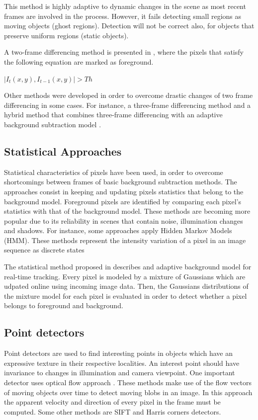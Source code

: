 This method is highly adaptive to dynamic changes in the scene as most recent frames are involved in the process. However, it fails detecting small regions as moving objects (ghost regions). Detection will not be correct also, for objects that preserve uniform regions (static objects).

A two-frame differencing method is presented in \cite{Lipton1998a}, where the pixels that satisfy the following equation are marked as foreground.\\
\centerline{$|I_t(x,y), I_{t-1}(x,y)|>Th$}

Other methods were developed in order to overcome drastic changes of two frame differencing in some cases. For instance, a three-frame differencing method \cite{Wang2003} and a hybrid method that combines three-frame differencing with an adaptive background subtraction model \cite{Collins2000}.

\subsection{Statistical Approaches}

Statistical characteristics of pixels have been used, in order to overcome shortcomings between frames of basic background subtraction methods. The approaches consist in keeping and updating pixels statistics that belong to the background model. Foreground pixels are identified by comparing each pixel's statistics with that of the background model. These methods are becoming more popular due to its reliability in scenes that contain noise, illumination changes and shadows. For instance, some approaches apply Hidden Markov Models (HMM). These methods \cite{Stenger2001,Rittscher2000} represent the intensity variation of a pixel in an image sequence as discrete states

The statistical method proposed in \cite{Pham2010} describes and adaptive background model for real-time tracking. Every pixel is modeled by a mixture of Gaussians which are udpated online using incoming image data. Then, the Gaussians distributions of the mixture model for each pixel is evaluated in order to detect whether a pixel belongs to foreground and background.

\subsection{Point detectors}

Point detectors are used to find interesting points in objects which have an expressive texture in their respective localities. An interest point should have invariance to changes in illumination and camera viewpoint. One important detector uses optical flow approach \cite{Shi1994}. These methods make use of the flow vectors of moving objects over time to detect moving blobs in an image. In this approach the apparent velocity and direction of every pixel in the frame must be computed. Some other methods are SIFT \cite{Lowe2004b} and Harris \cite{Harris1988} corners detectors.

